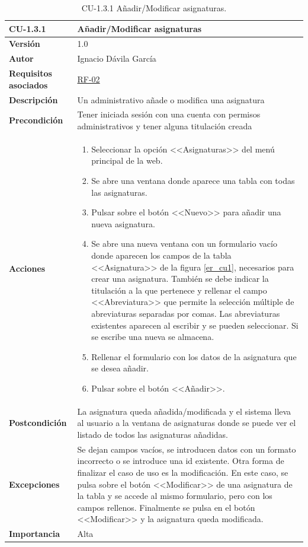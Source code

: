\begin{table}[p]
\label{table:CU-1.3.1}
	\centering
	\begin{tabularx}{\linewidth}{ p{} p{} }
		\toprule
		\textbf{CU-1.3.1}    & \textbf{Añadir/Modificar asignaturas}\\
		\toprule
		\textbf{Versión}              & 1.0    \\
		\textbf{Autor}                & Ignacio Dávila García \\
		\textbf{Requisitos asociados} & \hyperref[itm:RF2]{RF-02} \\
		\textbf{Descripción}          & Un administrativo añade o modifica una asignatura \\
		\textbf{Precondición}         & Tener iniciada sesión con una cuenta con permisos administrativos y tener alguna titulación creada \\
		\textbf{Acciones}             &
		\begin{enumerate}
			\def\labelenumi{\arabic{enumi}.}
			\tightlist
			\item Seleccionar la opción <<Asignaturas>> del menú principal de la web.
			\item Se abre una ventana donde aparece una tabla con todas las asignaturas.
			\item Pulsar sobre el botón <<Nuevo>> para añadir una nueva asignatura.
			\item Se abre una nueva ventana con un formulario vacío donde aparecen los campos de la tabla <<Asignatura>> de la figura \ref{er_cu1}, necesarios para crear una asignatura. También se debe indicar la titulación a la que pertenece y rellenar el campo <<Abreviatura>> que permite la selección múltiple de abreviaturas separadas por comas. Las abreviaturas existentes aparecen al escribir y se pueden seleccionar. Si se escribe una nueva se almacena.
			\item Rellenar el formulario con los datos de la asignatura que se desea añadir.
			\item Pulsar sobre el botón <<Añadir>>.
		\end{enumerate}\\
		\textbf{Postcondición}        & La asignatura queda añadida/modificada y el sistema lleva al usuario a la ventana de asignaturas donde se puede ver el listado de todos las asignaturas añadidas. \\
		\textbf{Excepciones}          & Se dejan campos vacíos, se introducen datos con un formato incorrecto o se introduce una id existente. Otra forma de finalizar el caso de uso es la modificación. En este caso, se pulsa sobre el botón <<Modificar>> de una asignatura de la tabla y se accede al mismo formulario, pero con los campos rellenos. Finalmente se pulsa en el botón <<Modificar>> y la asignatura queda modificada. \\
		\textbf{Importancia}          & Alta \\
		\bottomrule
	\end{tabularx}
	\caption{CU-1.3.1 Añadir/Modificar asignaturas.}
\end{table}
\FloatBarrier

